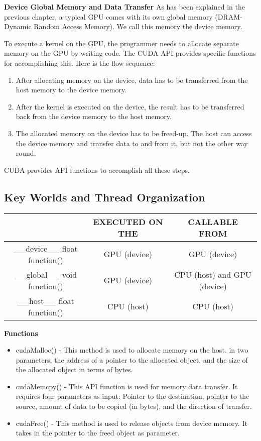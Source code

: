 \documentclass[../notes.tex]{subfiles}
\begin{document}
\textbf{Device Global Memory and Data Transfer}
As has been explained in the previous chapter, a typical GPU comes with its own global memory (DRAM- Dynamic Random Access Memory). We call this memory the device memory.

To execute a kernel on the GPU, the programmer needs to allocate separate memory on the GPU by writing code. The CUDA API provides specific functions for accomplishing this. Here is the flow sequence:

\begin{enumerate}
  \item After allocating memory on the device, data has to be transferred from the host memory to the device memory.
  \item After the kernel is executed on the device, the result has to be transferred back from the device memory to the host memory.
  \item The allocated memory on the device has to be freed-up. The host can access the device memory and transfer data to and from it, but not the other way round.
\end{enumerate}

CUDA provides API functions to accomplish all these steps.

\newpage

\subsection{Key Worlds and Thread Organization}
\begin{tabular}{ |c|c|c| } 
  \hline
   & EXECUTED ON THE & CALLABLE FROM \\
  \hline
  \_\_device\_\_ float function() & GPU (device) & GPU (device) \\
  \hline
  \_\_global\_\_ void function() & GPU (device) & CPU (host) and GPU (device) \\ 
  \hline
  \_\_host\_\_ float function() & CPU (host) & CPU (host) \\ 
  \hline
\end{tabular}

\textbf{Functions}
\begin{itemize}
\item cudaMalloc() - This method is used to allocate memory on the host. in two parameters, the address of a pointer to the allocated object, and the size of the allocated object in terms of bytes.
\item cudaMemcpy() - This API function is used for memory data transfer. It requires four parameters as input: Pointer to the destination, pointer to the source, amount of data to be copied (in bytes), and the direction of transfer.
\item cudaFree() - This method is used to release objects from device memory. It takes in the pointer to the freed object as parameter.
\end{itemize}
\end{document}
